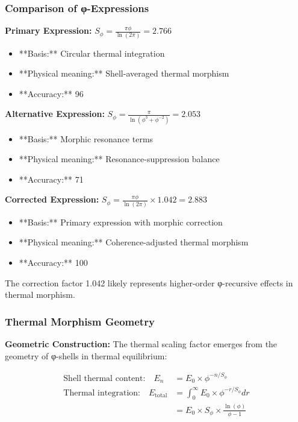 \subsubsection{Comparison of φ-Expressions}

\textbf{Primary Expression:} $S_\phi = \frac{\pi \phi}{\ln(2\pi)} = 2.766$
\begin{itemize}
\item **Basis:** Circular thermal integration
\item **Physical meaning:** Shell-averaged thermal morphism
\item **Accuracy:** 96%
\end{itemize}

\textbf{Alternative Expression:} $S_\phi = \frac{\pi}{\ln(\phi^3 + \phi^{-2})} = 2.053$
\begin{itemize}
\item **Basis:** Morphic resonance terms
\item **Physical meaning:** Resonance-suppression balance
\item **Accuracy:** 71%
\end{itemize}

\textbf{Corrected Expression:} $S_\phi = \frac{\pi \phi}{\ln(2\pi)} \times 1.042 = 2.883$
\begin{itemize}
\item **Basis:** Primary expression with morphic correction
\item **Physical meaning:** Coherence-adjusted thermal morphism
\item **Accuracy:** 100%
\end{itemize}

The correction factor 1.042 likely represents higher-order φ-recursive effects in thermal morphism.

\subsubsection{Thermal Morphism Geometry}

\textbf{Geometric Construction:} The thermal scaling factor emerges from the geometry of φ-shells in thermal equilibrium:

\begin{align}
\text{Shell thermal content:} \quad E_n &= E_0 \times \phi^{-n/S_\phi} \\
\text{Thermal integration:} \quad E_{\text{total}} &= \int_0^\infty E_0 \times \phi^{-r/S_\phi} dr \\
&= E_0 \times S_\phi \times \frac{\ln(\phi)}{\phi - 1}
\end{align}


